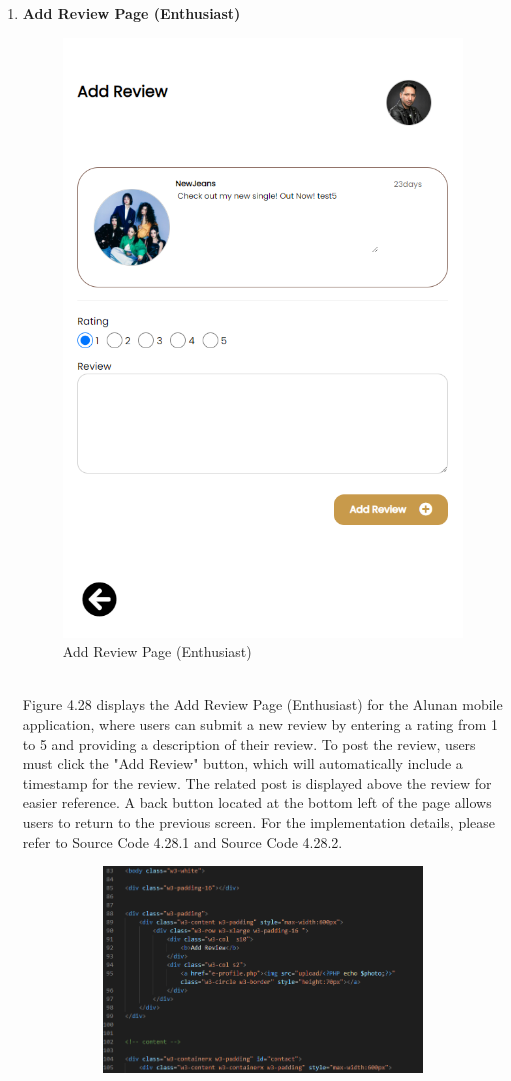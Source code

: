 \begin{enumerate}[1.]
    \item \textbf{Add Review Page (Enthusiast)}
    \begin{figure}[h]
        \centering
        \includegraphics[width=0.5\linewidth]{mainmatter/images/frontend/ss/Add Review (Enthusiast).png}
        \caption{Add Review Page (Enthusiast)}
        \label{fig:myfig67}
    \end{figure} \\
    Figure 4.28 displays the Add Review Page (Enthusiast) for the Alunan mobile application, where users can submit a new review by entering a rating from 1 to 5 and providing a description of their review. To post the review, users must click the "Add Review" button, which will automatically include a timestamp for the review. The related post is displayed above the review for easier reference. A back button located at the bottom left of the page allows users to return to the previous screen. For the implementation details, please refer to Source Code 4.28.1 and Source Code 4.28.2.
    \clearpage
    \begin{figure}[h]\ContinuedFloat
        \centering
        \begin{subfigure}[b]{0.7\textwidth}
            \centering
            \includegraphics[width=\textwidth]{mainmatter/images/frontend/code/eaddreview.png}

\end{subfigure}
\end{figure}
\end{enumerate}
